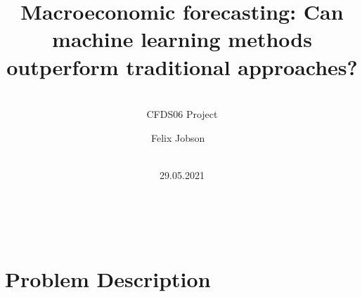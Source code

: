 \documentclass{beamer}
\begin{document}
















\title{\textbf{Macroeconomic forecasting: Can machine learning methods outperform traditional approaches?}}
\subtitle{\ \\CFDS06 Project}

\author{Felix Jobson
\ \\}
\date{\ \\ 29.05.2021} 

{
\begin{frame}
\frametitle{~}
\maketitle 
\end{frame}
}
\addtocounter{framenumber}{-1}










{
\section{Problem Description} 
}
\addtocounter{framenumber}{-1}
\end{document}
